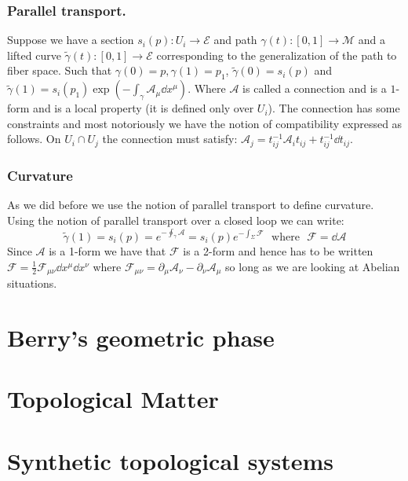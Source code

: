 \documentclass[10pt,a4paper]{book}
\begin{document}
\subsubsection{Parallel transport.}
\begin{figure}[h!]
\centering
{}
\end{figure}
Suppose we have a section $s_i(p) : U_i \to \mathcal{E}$ and path $\gamma(t) : [0, 1] \to \mathcal{M}$ and a lifted curve $\tilde{\gamma}(t) : [0, 1] \to \mathcal{E}$ corresponding to the generalization of the path to fiber space. Such that $\gamma(0) = p, \gamma(1) = p_1$, $\tilde{\gamma}(0) = s_i(p)$ and $\tilde{\gamma}(1) = s_i(p_1) \exp(- \int_\gamma \mathcal{A}_\mu \dd x^\mu )$. Where $\mathcal{A}$ is called a connection and is a $1$-form and is a local property (it is defined only over $U_i$). The connection has some constraints and most notoriously we have the notion of compatibility expressed as follows. On $U_i \cap U_j$ the connection must satisfy: $\mathcal{A}_j = t_{ij}^{-1} \mathcal{A}_i t_{ij} + t_{ij}^{-1} \dd t_{ij} $.

\subsubsection{Curvature}
As we did before we use the notion of parallel transport to define curvature. Using the notion of parallel transport over a closed loop we can write:
\[
\tilde{\gamma}(1) = s_i(p) = e^{-\oint_\gamma \mathcal{A}} = s_i(p) e^{-\int_\Sigma \mathcal{F}} \mbox{~~where~~} \mathcal{F} = \dd \mathcal{A}
\]
Since $\mathcal{A}$ is a 1-form we have that $\mathcal{F}$ is a 2-form and hence has to be written $\mathcal{F} = \frac{1}{2} \mathcal{F}_{\mu \nu}\dd x^\mu \dd x^\nu$ where $\mathcal{F}_{\mu \nu} = \partial_{\mu} \mathcal{A}_\nu - \partial_\nu \mathcal{A}_\mu$ so long as we are looking at Abelian situations. 

\section{Berry's geometric phase}
\section{Topological Matter}
\section{Synthetic topological systems}
\end{document}
